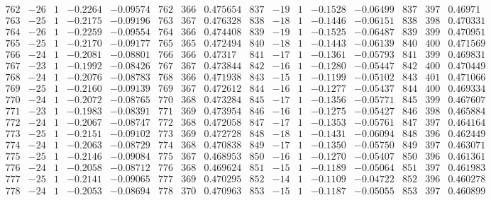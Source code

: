 \documentclass[11pt,reqno,a4letter]{article}
\numberwithin{figure}{section}
\numberwithin{table}{section}
\theoremstyle{plain}
\numberwithin{theorem}{section}
\theoremstyle{definition}
\begin{document}
\begin{table}[ht]
\begin{equation*}
{\begin{array}{ccccc|ccc|ccccc|ccc}
 762 & -26 & 1 & -0.2264 & -0.09574 & 762 & 366 & 0.475654 & 837 & -19 & 1 & -0.1528 & -0.06499 & 837 & 397 & 0.46971 \\
 763 & -25 & 1 & -0.2175 & -0.09196 & 763 & 367 & 0.476328 & 838 & -18 & 1 & -0.1446 & -0.06151 & 838 & 398 & 0.470331 \\
 764 & -26 & 1 & -0.2259 & -0.09554 & 764 & 366 & 0.474408 & 839 & -19 & 1 & -0.1525 & -0.06487 & 839 & 399 & 0.470951 \\
 765 & -25 & 1 & -0.2170 & -0.09177 & 765 & 365 & 0.472494 & 840 & -18 & 1 & -0.1443 & -0.06139 & 840 & 400 & 0.471569 \\
 766 & -24 & 1 & -0.2081 & -0.08801 & 766 & 366 & 0.47317 & 841 & -17 & 1 & -0.1361 & -0.05793 & 841 & 399 & 0.469831 \\
 767 & -23 & 1 & -0.1992 & -0.08426 & 767 & 367 & 0.473844 & 842 & -16 & 1 & -0.1280 & -0.05447 & 842 & 400 & 0.470449 \\
 768 & -24 & 1 & -0.2076 & -0.08783 & 768 & 366 & 0.471938 & 843 & -15 & 1 & -0.1199 & -0.05102 & 843 & 401 & 0.471066 \\
 769 & -25 & 1 & -0.2160 & -0.09139 & 769 & 367 & 0.472612 & 844 & -16 & 1 & -0.1277 & -0.05437 & 844 & 400 & 0.469334 \\
 770 & -24 & 1 & -0.2072 & -0.08765 & 770 & 368 & 0.473284 & 845 & -17 & 1 & -0.1356 & -0.05771 & 845 & 399 & 0.467607 \\
 771 & -23 & 1 & -0.1983 & -0.08391 & 771 & 369 & 0.473954 & 846 & -16 & 1 & -0.1275 & -0.05427 & 846 & 398 & 0.465884 \\
 772 & -24 & 1 & -0.2067 & -0.08747 & 772 & 368 & 0.472058 & 847 & -17 & 1 & -0.1353 & -0.05761 & 847 & 397 & 0.464164 \\
 773 & -25 & 1 & -0.2151 & -0.09102 & 773 & 369 & 0.472728 & 848 & -18 & 1 & -0.1431 & -0.06094 & 848 & 396 & 0.462449 \\
 774 & -24 & 1 & -0.2063 & -0.08729 & 774 & 368 & 0.470838 & 849 & -17 & 1 & -0.1350 & -0.05750 & 849 & 397 & 0.463071 \\
 775 & -25 & 1 & -0.2146 & -0.09084 & 775 & 367 & 0.468953 & 850 & -16 & 1 & -0.1270 & -0.05407 & 850 & 396 & 0.461361 \\
 776 & -24 & 1 & -0.2058 & -0.08712 & 776 & 368 & 0.469624 & 851 & -15 & 1 & -0.1189 & -0.05064 & 851 & 397 & 0.461983 \\
 777 & -25 & 1 & -0.2141 & -0.09065 & 777 & 369 & 0.470295 & 852 & -14 & 1 & -0.1109 & -0.04722 & 852 & 396 & 0.460278 \\
 778 & -24 & 1 & -0.2053 & -0.08694 & 778 & 370 & 0.470963 & 853 & -15 & 1 & -0.1187 & -0.05055 & 853 & 397 & 0.460899 \\

\end{array}}
\end{equation*}
\end{table}
\end{document}

